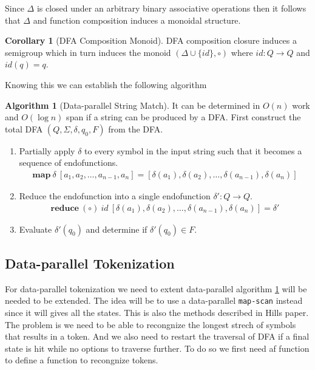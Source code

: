 \documentclass[a4paper,12pt]{article}
\theoremstyle{definition}
\newtheorem{corollary}{Corollary}[section]
\newtheorem{algorithm}{Algorithm}[section]
\begin{document}
\noindent Since $\Delta$ is closed under an arbitrary binary associative operations then it follows that $\Delta$ and function composition induces a monoidal structure.

\begin{corollary}[DFA Composition Monoid]
  DFA composition closure induces a semigroup which in turn induces the monoid $(\Delta \cup \{id\}, \circ)$ where $id: Q \to Q$ and $id(q) = q$.
\end{corollary}
\noindent Knowing this we can establish the following algorithm
\begin{algorithm}[Data-parallel String Match]\label{algo:lex}
  It can be determined in $O(n)$ work and $O(\log n)$ span if a string can be produced by a DFA. First construct the total DFA $(Q, \Sigma, \delta, q_0, F)$ from the DFA.
  \begin{enumerate}
    \item Partially apply $\delta$ to every symbol in the input string such that it becomes a sequence of endofunctions.
    \begin{align*}
      \mathbf{map}\: \delta \: [a_1, a_2, \dots, a_{n - 1}, a_n] = [\delta(a_1), \delta(a_2), \dots, \delta(a_{n - 1}), \delta(a_n)]
    \end{align*}
    \item Reduce the endofunction into a single endofunction $\delta': Q \to Q$. \begin{align*}
      \mathbf{reduce} \: (\circ) \: id \: [\delta(a_1), \delta(a_2), \dots, \delta(a_{n - 1}), \delta(a_n)] = \delta'
    \end{align*}
    \item Evaluate $\delta'(q_0)$ and determine if $\delta'(q_0) \in F$.
  \end{enumerate}
\end{algorithm}

\subsection{Data-parallel Tokenization}
For data-parallel tokenization we need to extent data-parallel algorithm \ref{algo:lex} will be needed to be extended. The idea will be to use a data-parallel \texttt{map-scan} instead since it will gives all the states. This is also the methods described in Hills \cite{HILL1992699} paper. The problem is we need to be able to recongnize the longest strech of symbols that results in a token. And we also need to restart the traversal of DFA if a final state is hit while no options to traverse further. To do so we first need af function to define a function to recongnize tokens.
\end{document}
